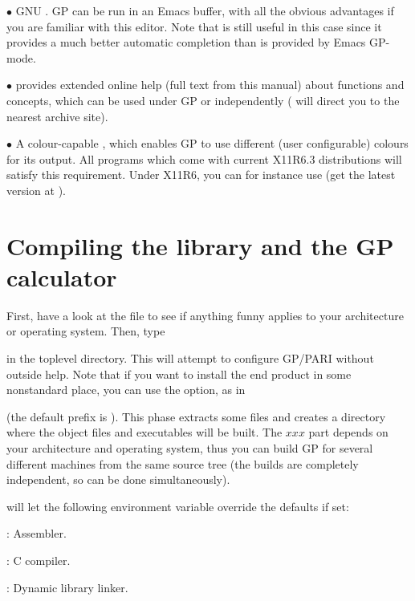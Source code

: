   $\bullet$ GNU . GP can be run in an Emacs buffer, with all the
obvious advantages if you are familiar with this editor. Note that
 is still useful in this case since it provides a much better
automatic completion than is provided by Emacs GP-mode.

  $\bullet$  provides extended online help (full text from this
manual) about functions and concepts, which can be used under GP or
independently ( will direct you to the nearest
 archive site).

  $\bullet$ A colour-capable , which enables GP to use different
(user configurable) colours for its output. All  programs which come
with current X11R6.3 distributions will satisfy this requirement. Under X11R6,
you can for instance use  (get the latest version at
).

\vfill\eject
\section{Compiling the library and the GP calculator}

 First, have a look at the  file
to see if anything funny applies to your architecture or operating system.
Then, type 


\noindent in the toplevel directory. This will attempt to configure GP/PARI
without outside help. Note that if you want to install the end product in
some nonstandard place, you can use the  option, as in


\noindent (the default prefix is ). This phase extracts some
files and creates a directory  where the object files and
executables will be built. The $xxx$ part depends on your architecture and
operating system, thus you can build GP for several different machines from
the same source tree (the builds are completely independent, so can be done
simultaneously).

\noindent {} will let the following environment variable
override the defaults if set:

: Assembler.

: C compiler.

: Dynamic library linker.


